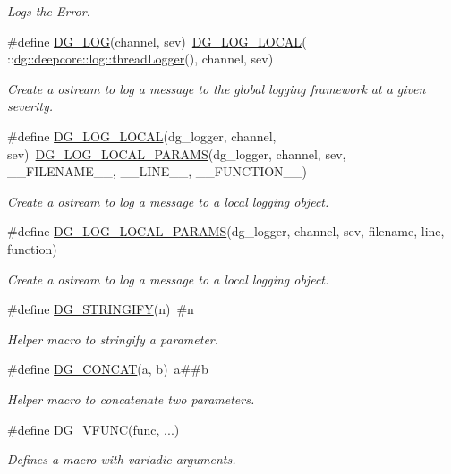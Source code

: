 \begin{DoxyCompactItemize}
\begin{DoxyCompactList}\small\item\em Logs the Error. \end{DoxyCompactList}\item 
\#define \hyperlink{group___utility_module_gaccdc4ecc408590a0c9e70a014e36df03}{D\+G\+\_\+\+L\+OG}(channel,  sev)~\hyperlink{group___utility_module_gaf0f303ba463f71805710b4ad637b5140}{D\+G\+\_\+\+L\+O\+G\+\_\+\+L\+O\+C\+AL}( \+::\hyperlink{group___utility_module_ga94a3335f72a1830e58c8386c35015b2b}{dg\+::deepcore\+::log\+::thread\+Logger}(), channel, sev)
\begin{DoxyCompactList}\small\item\em Create a ostream to log a message to the global logging framework at a given severity. \end{DoxyCompactList}\item 
\#define \hyperlink{group___utility_module_gaf0f303ba463f71805710b4ad637b5140}{D\+G\+\_\+\+L\+O\+G\+\_\+\+L\+O\+C\+AL}(dg\+\_\+logger,  channel,  sev)~\hyperlink{group___utility_module_ga5da92d91fa3446e9251ec613e360b8d5}{D\+G\+\_\+\+L\+O\+G\+\_\+\+L\+O\+C\+A\+L\+\_\+\+P\+A\+R\+A\+MS}(dg\+\_\+logger, channel, sev, \+\_\+\+\_\+\+F\+I\+L\+E\+N\+A\+M\+E\+\_\+\+\_\+, \+\_\+\+\_\+\+L\+I\+N\+E\+\_\+\+\_\+, \+\_\+\+\_\+\+F\+U\+N\+C\+T\+I\+O\+N\+\_\+\+\_\+)
\begin{DoxyCompactList}\small\item\em Create a ostream to log a message to a local logging object. \end{DoxyCompactList}\item 
\#define \hyperlink{group___utility_module_ga5da92d91fa3446e9251ec613e360b8d5}{D\+G\+\_\+\+L\+O\+G\+\_\+\+L\+O\+C\+A\+L\+\_\+\+P\+A\+R\+A\+MS}(dg\+\_\+logger,  channel,  sev,  filename,  line,  function)
\begin{DoxyCompactList}\small\item\em Create a ostream to log a message to a local logging object. \end{DoxyCompactList}\item 
\#define \hyperlink{group___utility_module_ga6a5f1106da82853b244076fd9e836864}{D\+G\+\_\+\+S\+T\+R\+I\+N\+G\+I\+FY}(n)~\#n
\begin{DoxyCompactList}\small\item\em Helper macro to stringify a parameter. \end{DoxyCompactList}\item 
\#define \hyperlink{group___utility_module_gadf8d173e1b80686691061b680ce1b062}{D\+G\+\_\+\+C\+O\+N\+C\+AT}(a,  b)~a\#\#b
\begin{DoxyCompactList}\small\item\em Helper macro to concatenate two parameters. \end{DoxyCompactList}\item 
\#define \hyperlink{group___utility_module_ga0f639943a56e3c011d388b31a68e41e5}{D\+G\+\_\+\+V\+F\+U\+NC}(func, ...)
\begin{DoxyCompactList}\small\item\em Defines a macro with variadic arguments. \end{DoxyCompactList}\end{DoxyCompactItemize}
